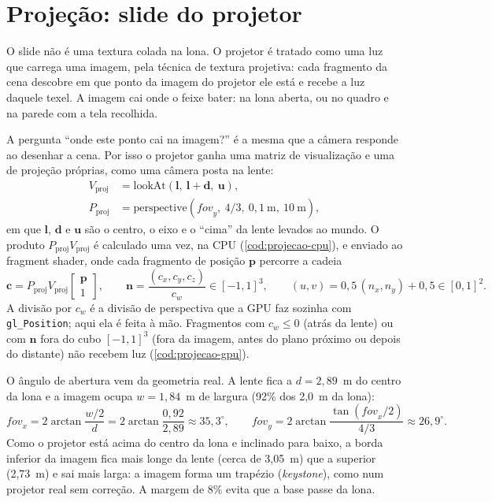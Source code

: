 \documentclass[
  12pt,          %
  oneside,       %
  a4paper,       %
  chapter=TITLE, %
  english,
  brazil,        %
]{abntex2}
\begin{document}
\section{Projeção: slide do projetor}
\label{sec:projecao}

O slide não é uma textura colada na lona. O projetor é tratado como uma luz que carrega uma imagem, pela
técnica de textura projetiva: cada fragmento da cena descobre em que ponto da imagem do
projetor ele está e recebe a luz daquele texel. A imagem cai onde o feixe bater: na lona aberta, ou no quadro e
na parede com a tela recolhida.

A pergunta ``onde este ponto cai na imagem?'' é a mesma que a câmera responde ao desenhar a cena. Por isso o
projetor ganha uma matriz de visualização e uma de projeção próprias, como uma câmera posta na lente:
\begin{align}
  V_{\text{proj}} &= \mathrm{lookAt}(\mathbf{l},\ \mathbf{l} + \mathbf{d},\ \mathbf{u}), \\
  P_{\text{proj}} &= \mathrm{perspective}(\mathit{fov}_y,\ 4/3,\ 0{,}1~\text{m},\ 10~\text{m}),
\end{align}
em que $\mathbf{l}$, $\mathbf{d}$ e $\mathbf{u}$ são o centro, o eixo e o ``cima'' da lente levados ao mundo.
O produto $P_{\text{proj}} V_{\text{proj}}$ é calculado uma vez, na CPU (\autoref{cod:projecao-cpu}), e
enviado ao fragment shader, onde cada fragmento de posição $\mathbf{p}$ percorre a cadeia
\begin{equation}
  \mathbf{c} = P_{\text{proj}} V_{\text{proj}} \begin{bmatrix}\mathbf{p}\\1\end{bmatrix}, \qquad
  \mathbf{n} = \frac{(c_x, c_y, c_z)}{c_w} \in [-1, 1]^3, \qquad
  (u, v) = 0{,}5\,(n_x, n_y) + 0{,}5 \in [0, 1]^2 .
  \label{eq:projecao}
\end{equation}
A divisão por $c_w$ é a divisão de perspectiva que a GPU faz sozinha com \texttt{gl\_Position}; aqui ela é
feita à mão. Fragmentos com $c_w \le 0$ (atrás da lente) ou com $\mathbf{n}$ fora do cubo $[-1, 1]^3$ (fora
da imagem, antes do plano próximo ou depois do distante) não recebem luz (\autoref{cod:projecao-gpu}).

O ângulo de abertura vem da geometria real. A lente fica a $d = 2{,}89$~m do centro da lona e a imagem
ocupa $w = 1{,}84$~m de largura (92\% dos 2,0~m da lona):
\begin{equation}
  \mathit{fov}_x = 2\arctan\frac{w/2}{d} = 2\arctan\frac{0{,}92}{2{,}89} \approx 35{,}3^\circ, \qquad
  \mathit{fov}_y = 2\arctan\frac{\tan(\mathit{fov}_x/2)}{4/3} \approx 26{,}9^\circ.
\end{equation}
Como o projetor está acima do centro da lona e inclinado para baixo, a borda inferior da imagem fica mais longe
da lente (cerca de 3,05~m) que a superior (2,73~m) e sai mais larga: a imagem forma um trapézio
(\emph{keystone}), como num projetor real sem correção. A margem de 8\% evita que a base passe da lona.
\end{document}
